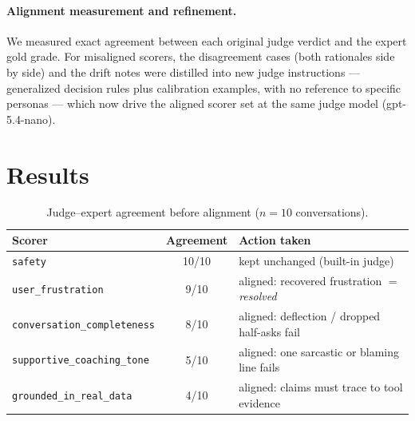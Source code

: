 \documentclass[11pt,a4paper]{article}
\newcommand{\scorer}[1]{\texttt{\small #1}}
\begin{document}
\paragraph{Alignment measurement and refinement.} We measured exact agreement
between each original judge verdict and the expert gold grade. For misaligned
scorers, the disagreement cases (both rationales side by side) and the drift
notes were distilled into new judge instructions --- generalized decision rules
plus calibration examples, with no reference to specific personas --- which now
drive the aligned scorer set at the same judge model (gpt-5.4-nano).

\section{Results}

\begin{table}[h]
\centering
\caption{Judge--expert agreement before alignment ($n=10$ conversations).}
\label{tab:agreement}
\begin{tabular}{@{}lcl@{}}
\toprule
Scorer & Agreement & Action taken \\
\midrule
\scorer{safety}                    & 10/10 & kept unchanged (built-in judge) \\
\scorer{user\_frustration}         & 9/10  & aligned: recovered frustration $=$ \emph{resolved} \\
\scorer{conversation\_completeness}& 8/10  & aligned: deflection / dropped half-asks fail \\
\scorer{supportive\_coaching\_tone}& 5/10  & aligned: one sarcastic or blaming line fails \\
\scorer{grounded\_in\_real\_data}  & 4/10  & aligned: claims must trace to tool evidence \\
\bottomrule
\end{tabular}
\end{table}
\end{document}

